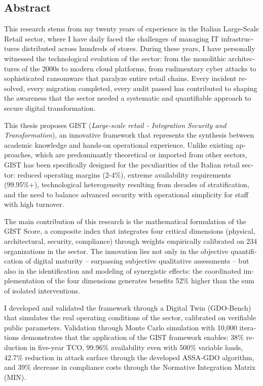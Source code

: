 \documentclass[12pt,a4paper,oneside]{book}
\begin{document}
\begin{otherlanguage}{english}
\section*{Abstract}
This research stems from my twenty years of experience in the Italian Large-Scale Retail sector, where I have daily faced the challenges of managing IT infrastructures distributed across hundreds of stores. During these years, I have personally witnessed the technological evolution of the sector: from the monolithic architectures of the 2000s to modern cloud platforms, from rudimentary cyber attacks to sophisticated ransomware that paralyze entire retail chains. Every incident resolved, every migration completed, every audit passed has contributed to shaping the awareness that the sector needed a systematic and quantifiable approach to secure digital transformation.

This thesis proposes GIST (\textit{Large-scale retail - Integration Security and Transformation}), an innovative framework that represents the synthesis between academic knowledge and hands-on operational experience. Unlike existing approaches, which are predominantly theoretical or imported from other sectors, GIST has been specifically designed for the peculiarities of the Italian retail sector: reduced operating margins (2-4\%), extreme availability requirements (99.95\%+), technological heterogeneity resulting from decades of stratification, and the need to balance advanced security with operational simplicity for staff with high turnover.

The main contribution of this research is the mathematical formulation of the GIST Score, a composite index that integrates four critical dimensions (physical, architectural, security, compliance) through weights empirically calibrated on 234 organizations in the sector. The innovation lies not only in the objective quantification of digital maturity -- surpassing subjective qualitative assessments -- but also in the identification and modeling of synergistic effects: the coordinated implementation of the four dimensions generates benefits 52\% higher than the sum of isolated interventions.

I developed and validated the framework through a Digital Twin (GDO-Bench) that simulates the real operating conditions of the sector, calibrated on verifiable public parameters. Validation through Monte Carlo simulation with 10,000 iterations demonstrates that the application of the GIST framework enables: 38\% reduction in five-year TCO, 99.96\% availability even with 500\% variable loads, 42.7\% reduction in attack surface through the developed ASSA-GDO algorithm, and 39\% decrease in compliance costs through the Normative Integration Matrix (MIN).


\end{otherlanguage}
\end{document}
